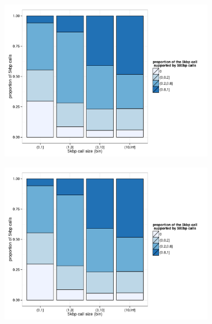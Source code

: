 \begin{figure}[htp]
  \centering
  \begin{subfigure}{.48\textwidth}
    \includegraphics[width=\linewidth, page=2]{figures/twin-binSizeComp.pdf}
    \caption{}
    \label{fig:size:spec}
  \end{subfigure}
  \begin{subfigure}{.48\textwidth}
    \includegraphics[width=\linewidth, page=4]{figures/twin-binSizeComp.pdf}
    \caption{}
    \label{fig:size:zdel}
  \end{subfigure}


\end{figure}

